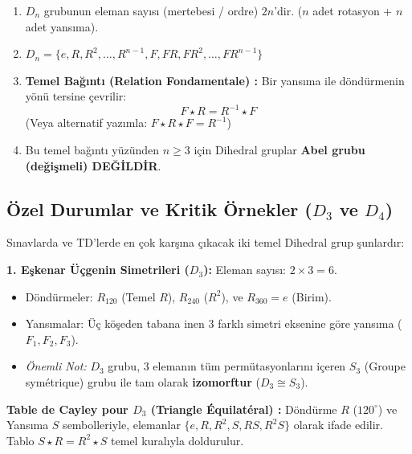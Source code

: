 \documentclass[12pt,a4paper]{report}
\begin{document}
\begin{tcolorbox}[colback=red!5!white,colframe=red!75!black,title=Dihedral Grup Özellikleri]
\begin{enumerate}
    \item $D_n$ grubunun eleman sayısı (mertebesi / ordre) $2n$'dir. ($n$ adet rotasyon + $n$ adet yansıma).
    \item $D_n = \{ e, R, R^2, \dots, R^{n-1}, F, FR, FR^2, \dots, FR^{n-1} \}$
    \item \textbf{Temel Bağıntı (Relation Fondamentale) :} Bir yansıma ile döndürmenin yönü tersine çevrilir:
    \[ F \star R = R^{-1} \star F \]
    (Veya alternatif yazımla: $F \star R \star F = R^{-1}$)
    \item Bu temel bağıntı yüzünden $n \geq 3$ için Dihedral gruplar \textbf{Abel grubu (değişmeli) DEĞİLDİR}.
\end{enumerate}
\end{tcolorbox}

\subsection*{Özel Durumlar ve Kritik Örnekler ($D_3$ ve $D_4$)}
Sınavlarda ve TD'lerde en çok karşına çıkacak iki temel Dihedral grup şunlardır:

\textbf{1. Eşkenar Üçgenin Simetrileri ($D_3$):} 
Eleman sayısı: $2 \times 3 = 6$.
\begin{itemize}
    \item Döndürmeler: $R_{120}$ (Temel $R$), $R_{240}$ ($R^2$), ve $R_{360}=e$ (Birim).
    \item Yansımalar: Üç köşeden tabana inen 3 farklı simetri eksenine göre yansıma ($F_1, F_2, F_3$).
    \item \textit{Önemli Not:} $D_3$ grubu, 3 elemanın tüm permütasyonlarını içeren $S_3$ (Groupe symétrique) grubu ile tam olarak \textbf{izomorftur} ($D_3 \cong S_3$).
\end{itemize}

\textbf{Table de Cayley pour $D_3$ (Triangle Équilatéral) :}
Döndürme $R$ ($120^\circ$) ve Yansıma $S$ sembolleriyle, elemanlar $\{e, R, R^2, S, RS, R^2S\}$ olarak ifade edilir. Tablo $S \star R = R^2 \star S$ temel kuralıyla doldurulur.
\end{document}
